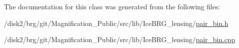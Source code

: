 The documentation for this class was generated from the following files\-:\begin{DoxyCompactItemize}
\item 
/disk2/brg/git/\-Magnification\-\_\-\-Public/src/lib/\-Ice\-B\-R\-G\-\_\-lensing/\hyperlink{pair__bin_8h}{pair\-\_\-bin.\-h}\item 
/disk2/brg/git/\-Magnification\-\_\-\-Public/src/lib/\-Ice\-B\-R\-G\-\_\-lensing/\hyperlink{pair__bin_8cpp}{pair\-\_\-bin.\-cpp}\end{DoxyCompactItemize}
